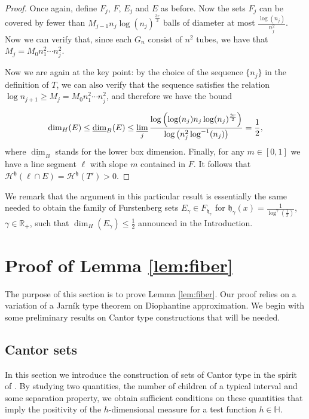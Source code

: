 \documentclass[11pt,a4paper]{amsart}
\begin{document}
\begin{proof}
Once again, define $F_j$, $F$, $E_j$ and $E$ as before. Now the
sets $F_j$ can be covered by fewer than
$M_{j-1}n_j\log(n_j)^\frac{3r}{2}$ balls of diameter at most
$\frac{\log(n_{j})}{n_{j}^2}$. Now we can verify that, since each
$G_n$ consist of $n^2$ tubes, we have that $M_j=M_0n_1^2\cdots
n_j^2$. 

Now we are again at the key point: by the choice of the sequence $\{n_j\}$ in the definition of $T$, we can also verify that the sequence  satisfies
the relation $\log{n_{j+1}}\ge M_{j}=M_0n_1^2\cdots n_j^2$, and
therefore we have the bound

\begin{equation*}
\dim_H(E)\le\underline{\dim}_B(E)\le\varliminf_j\frac{\log\left(\log(n_{j})
n_j\log(n_j)^\frac{3r}{2}
\right)}{\log\left(n_{j}^2\log^{-1}(n_j)\right)}=\frac{1}{2},
\end{equation*}
 where $\underline{\dim}_B$ stands for the lower box dimension.
Finally, for any $m\in[0,1]$ we have a line segment $\ell$ with
slope $m$ contained in $F$. It follows that ${\mathcal{H}^{{\mathfrak{h}}}}(\ell\cap
E)={\mathcal{H}^{{\mathfrak{h}}}}(T')>0$.
\end{proof}

We remark that the argument in this particular result is
essentially the same needed to obtain the family of Furstenberg
sets $E_\gamma\in F_{{\mathfrak{h}}_\gamma}$ for
${\mathfrak{h}}_\gamma(x)=\frac{1}{\log^\gamma(\frac{1}{x})}$,
$\gamma\in{\mathbb{R}}_+$, such that $\dim_H(E_\gamma)\le \frac{1}{2}$
announced in the Introduction.

\section{Proof of Lemma \ref{lem:fiber}}\label{sec:fiber}

The purpose of this section is to prove Lemma \ref{lem:fiber}. Our proof relies on a variation of a Jarn\'ik type theorem on Diophantine approximation.  We begin with some preliminary results on Cantor type constructions that will be needed. 

\subsection{Cantor sets}\label{sec:cantor}

In this section we introduce the construction of sets of Cantor
type in the spirit of \cite{fal03}. By studying two quantities,
the number of children of a typical interval and some separation
property, we obtain sufficient conditions on these quantities
that imply the positivity of the $h$-dimensional measure for a
test function $h\in{\mathbb{H}}$.
\end{document}
